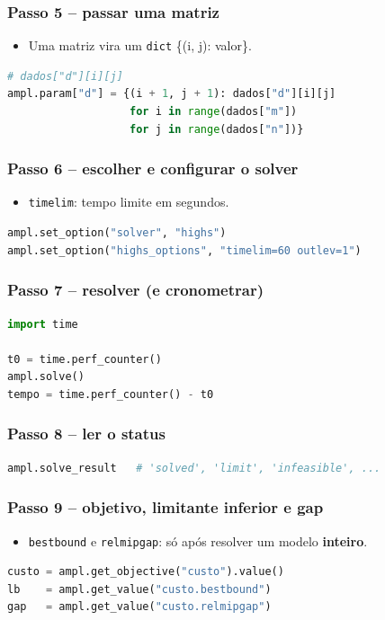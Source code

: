 \documentclass[fleqn]{beamer}
\begin{document}
\begin{frame}[fragile]
	\frametitle{Passo 5 -- passar uma matriz}
	\begin{itemize}
		\item Uma matriz vira um \texttt{dict} \{(i, j): valor\}.
	\end{itemize}
	\begin{lstlisting}[language=Python,basicstyle=\ttfamily\small]
# dados["d"][i][j]
ampl.param["d"] = {(i + 1, j + 1): dados["d"][i][j]
                   for i in range(dados["m"])
                   for j in range(dados["n"])}
	\end{lstlisting}
\end{frame}

\begin{frame}[fragile]
	\frametitle{Passo 6 -- escolher e configurar o solver}
	\begin{itemize}
		\item \texttt{timelim}: tempo limite em segundos.
	\end{itemize}
	\begin{lstlisting}[language=Python,basicstyle=\ttfamily\small]
ampl.set_option("solver", "highs")
ampl.set_option("highs_options", "timelim=60 outlev=1")
	\end{lstlisting}
\end{frame}

\begin{frame}[fragile]
	\frametitle{Passo 7 -- resolver (e cronometrar)}
	\begin{lstlisting}[language=Python,basicstyle=\ttfamily\small]
import time

t0 = time.perf_counter()
ampl.solve()
tempo = time.perf_counter() - t0
	\end{lstlisting}
\end{frame}

\begin{frame}[fragile]
	\frametitle{Passo 8 -- ler o status}
	\begin{lstlisting}[language=Python,basicstyle=\ttfamily\small]
ampl.solve_result   # 'solved', 'limit', 'infeasible', ...
	\end{lstlisting}
\end{frame}

\begin{frame}[fragile]
	\frametitle{Passo 9 -- objetivo, limitante inferior e gap}
	\begin{itemize}
		\item \texttt{bestbound} e \texttt{relmipgap}: só após resolver
			um modelo \textbf{inteiro}.
	\end{itemize}
	\begin{lstlisting}[language=Python,basicstyle=\ttfamily\small]
custo = ampl.get_objective("custo").value()
lb    = ampl.get_value("custo.bestbound")
gap   = ampl.get_value("custo.relmipgap")
	\end{lstlisting}
\end{frame}
\end{document}
